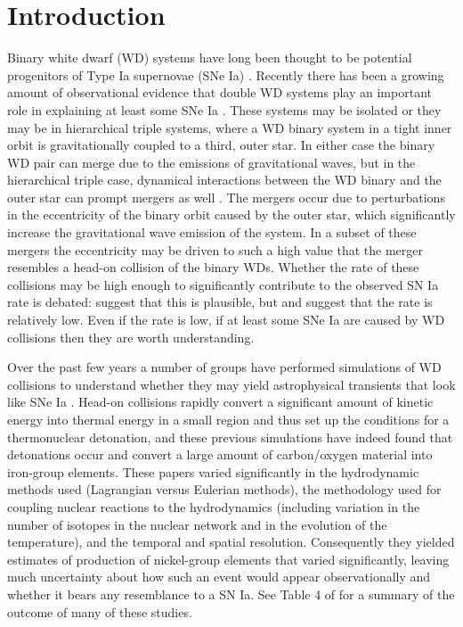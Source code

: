\documentclass[twocolumn,numberedappendix]{../aastex6}
\begin{document}
\section{Introduction}
\label{sec:introduction}

Binary white dwarf (WD) systems have long been thought to be potential progenitors
of Type Ia supernovae (SNe Ia) \citep{ibentutukov:1984,webbink:1984}. Recently there
has been a growing amount of observational evidence that double WD systems play
an important role in explaining at least some SNe Ia \citep{maoz:2014}. These systems
may be isolated or they may be in hierarchical triple systems, where a WD binary
system in a tight inner orbit is gravitationally coupled to a third, outer star.
In either case the binary WD pair can merge due to the emissions of gravitational waves,
but in the hierarchical triple case, dynamical interactions between the WD binary and
the outer star can prompt mergers as well \citep{thompson:2011,hamers:2013}. The mergers
occur due to perturbations in the eccentricity of the binary orbit caused by the outer
star, which significantly increase the gravitational wave emission of the system. In a
subset of these mergers the eccentricity may be driven to such a high value that the
merger resembles a head-on collision of the binary WDs. Whether the rate of these collisions
may be high enough to significantly contribute to the observed SN Ia rate is debated:
\cite{katzdong:2012} suggest that this is plausible, but \cite{hamers:2013} and
\cite{papish:2015} suggest that the rate is relatively low. Even if the rate is low,
if at least some SNe Ia are caused by WD collisions then they are worth understanding.

Over the past few years a number of groups have performed simulations of WD collisions
to understand whether they may yield astrophysical transients that look like SNe Ia
\citep{rosswog:2009,raskin:2010,loren-aguilar:2010,hawley:2012,garcia-senz:2013,
kushnir:2013,papish:2015,holcomb:2015}. Head-on collisions rapidly convert a significant
amount of kinetic energy into thermal energy in a small region and thus set up the
conditions for a thermonuclear detonation, and these previous simulations have indeed
found that detonations occur and convert a large amount of carbon/oxygen material into
iron-group elements. These papers varied significantly in the hydrodynamic methods used
(Lagrangian versus Eulerian methods), the methodology used for coupling nuclear
reactions to the hydrodynamics (including variation in the number of isotopes in
the nuclear network and in the evolution of the temperature), and the temporal and
spatial resolution. Consequently they yielded estimates of production of nickel-group
elements that varied significantly, leaving much uncertainty about how such an event
would appear observationally and whether it bears any resemblance to a SN Ia.
See Table 4 of \cite{garcia-senz:2013} for a summary of the outcome of many of these studies.
\end{document}
